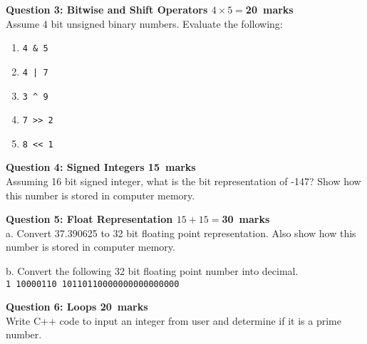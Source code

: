 \documentclass[12pt,a4paper]{article}
\def\Qthree{20}
\def\Qfour{15}
\def\Qfive{30}
\def\Qsix{20}
\begin{document}
\noindent\textbf{Question 3: Bitwise and Shift Operators \hfill $4\times 5=$\Qthree~marks}\\
Assume 4 bit unsigned binary numbers. Evaluate the following:
\begin{enumerate}
\item \verb|4 & 5|
\item \verb$4 | 7$
\item \verb|3 ^ 9|
\item \verb|7 >> 2|
\item \verb|8 << 1|
\end{enumerate}
\begin{figure}[H]
\end{figure}

\noindent\textbf{Question 4: Signed Integers \hfill \Qfour~marks}\\
Assuming 16 bit signed integer, what is the bit representation of -147? Show how this number is stored in computer memory.
\begin{figure}[H]
\end{figure}

\noindent\textbf{Question 5: Float Representation \hfill $15+15=$\Qfive~marks}\\
a. Convert 37.390625 to 32 bit floating point representation. Also show how this number is stored in computer memory.
\begin{figure}[H]
\end{figure}
\noindent b. Convert the following 32 bit floating point number into decimal.\\
\verb|1 10000110 10110110000000000000000|
\begin{figure}[H]
\end{figure}
\noindent\textbf{Question 6: Loops \hfill \Qsix~marks}\\
Write C++ code to input an integer from user and determine if it is a prime number.
\begin{figure}[H]
\end{figure}
\end{document}
